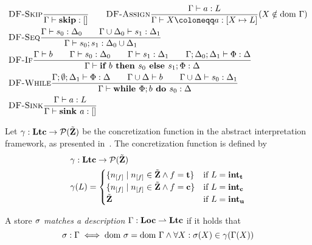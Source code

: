 \begin{align*}
    &\trule{DF-Skip}{}{\typestep{\Gamma}{\skipcmd}{[]}}\qquad
    \trule{DF-Assign}{\typestep{\Gamma}{a}{L}}
    {\typestep{\Gamma}{\defaultstore}{[X \mapsto L]}} \text{($X \notin \dom\Gamma$)}\\
    &\trule{DF-Seq}{\typestep{\Gamma}{s_0}{\Delta_0}\qquad
    \typestep{\Gamma \cup \Delta_0}{s_1}{\Delta_1}}{\typestep{\Gamma}{\defaultssaseq}{\Delta_0 \cup \Delta_1}}\\
    &\trule{DF-If}{\typestmt{\Gamma}{b}\qquad\typestep{\Gamma}{s_0}{\Delta_0}\qquad \typestep{\Gamma}{s_1}{\Delta_1}\qquad
    \typestep{\Gamma;\Delta_0;\Delta_1}{\philist}{\Delta}}
    {\typestep{\Gamma}{\defaultssaif}{\Delta}}\\
    &\trule{DF-While}{\typestep{\Gamma;\emptyset;\Delta_1}{\philist}{\Delta}\qquad
    \typestmt{\Gamma \cup \Delta}{b}\qquad\typestep{\Gamma \cup \Delta}{s_0}{\Delta_1}}
    {\typestep{\Gamma}{\defaultssawhile}{\Delta}}\\
    &\trule{DF-Sink}{\typestep{\Gamma}{a}{L}}{\typestep{\Gamma}{\sink{a}}{[]}}\\
\end{align*}

\begin{definition}
    Let $\gamma:\textbf{Ltc} \to \operatorname{\mathcal{P}}(\tilde{\textbf{Z}})$ be the concretization function in the abstract interpretation framework,
    as presented in~\cite{abstractinterpretation}.
    The concretization function is defined by
    \begin{align*}
        &\gamma:\lattice \to \P(\StoreDomain)\\
        &\gamma(L) = \begin{cases}
            \{\flagged{} \mid \flagged{} \in \StoreDomain \land f = \textbf{t}\} & \text{if }L = \ltracked\\
            \{\flagged{} \mid \flagged{} \in \StoreDomain \land  f = \textbf{c}\} & \text{if }L = \lclean\\
            \StoreDomain & \text{if }L = \lunknown\\
        \end{cases}
    \end{align*}
\end{definition}

\begin{definition}
    A store $\sigma$ \emph{matches a description} $\Gamma: \textbf{Loc} \rightharpoonup \textbf{Ltc}$ if it holds that
    \begin{equation*}
        {\sigma}:{\Gamma} \;\Longleftrightarrow\; \text{dom }{\sigma} = \text{dom }{\Gamma} \land \forall X: \sigma(X) \in \gamma(\Gamma(X))
    \end{equation*}
\end{definition}

